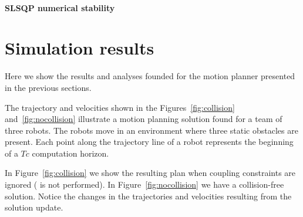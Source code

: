\documentclass[eprint]{actapoly}
\begin{document}
\paragraph{SLSQP numerical stability}





\section{Simulation results}

Here we show the results and analyses founded for the motion planner presented
in the previous sections.

The trajectory and velocities shown in the Figures~\ref{fig:collision} and~\ref{fig:nocollision}
illustrate a motion planning solution found for a team of three robots.
The robots move in an environment where three static obstacles are present.
Each point along the trajectory line of a robot represents the beginning
of a $Tc$ computation horizon.

In Figure~\ref{fig:collision} we show the resulting plan when coupling constraints
are ignored ( is not performed). In Figure~\ref{fig:nocollision}
we have a collision-free solution. Notice the changes in the trajectories and
velocities resulting from the solution update.

\end{document}
